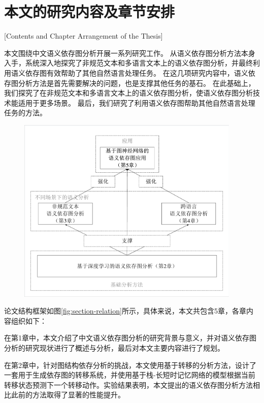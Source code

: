 \section{本文的研究内容及章节安排}[Contents and Chapter Arrangement of the Thesis]

本文围绕中文语义依存图分析开展一系列研究工作。
从语义依存图分析方法本身入手，系统深入地探究了非规范文本和多语言文本上的语义依存图分析，并最终利用语义依存图有效帮助了其他自然语言处理任务。
在这几项研究内容中，语义依存图分析方法是首先需要解决的问题，也是支撑其他任务的基石。
在此基础上，我们探究了在非规范文本和多语言文本上的语义依存图分析，使语义依存图分析技术能适用于更多场景。
最后，我们研究了利用语义依存图帮助其他自然语言处理任务的方法。

\begin{figure}[htbp]
    \centering
    \includegraphics[width=0.95\textwidth]{figures/section-relation.pdf}
\end{figure}

论文结构框架如图\ref{fig:section-relation}所示，具体来说，本文共包含5章，各章内容组织如下：

在第1章中，本文介绍了中文语义依存图分析的研究背景与意义，并对语义依存图分析的研究现状进行了概述与分析，最后对本文主要内容进行了规划。

在第2章中，针对图结构依存分析的挑战，本文使用基于转移的分析方法，设计了一套用于生成依存图的转移系统，并使用基于栈-长短时记忆网络的模型根据当前转移状态预测下一个转移动作。实验结果表明，本文提出的语义依存图分析方法相比此前的方法取得了显著的性能提升。

